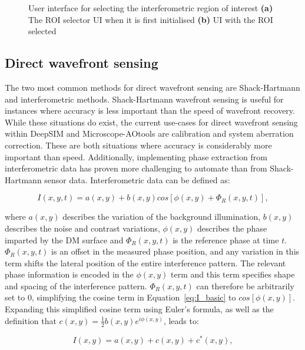 \begin{figure}[h]
\begin{subfigure}{0.4\textwidth}
		\caption{}
		\label{fig:ROI_selector}
	\end{subfigure}
	\caption[User interface for selecting the interferometric region of interest]{User interface for selecting the interferometric region of interest \textbf{(a)} The ROI selector UI when it is first initialised \textbf{(b)} UI with the ROI selected}
	\label{fig:ROI_selectors}
\end{figure}

\subsection{Direct wavefront sensing}
\label{subsec:direct_wavefront_sensing}

The two most common methods for direct wavefront sensing are Shack-Hartmann and interferometric methods. Shack-Hartmann wavefront sensing is useful for instances where accuracy is less important than the speed of wavefront recovery. While these situations do exist, the current use-cases for direct wavefront sensing within DeepSIM and Microscope-AOtools are calibration and system aberration correction. These are both situations where accuracy is considerably more important than speed. Additionally, implementing phase extraction from interferometric data has proven more challenging  to automate than from Shack-Hartmann sensor data. Interferometric data can be defined as:

\begin{equation}\label{eq:I_basic}
I(x,y,t) = a(x,y) + b(x,y)cos[\phi(x,y) + \Phi_{R}(x,y,t)],
\end{equation}

where $a(x,y)$ describes the variation of the background illumination, $b(x,y)$ describes the noise and contrast variations, $\phi(x,y)$ describes the phase imparted by the DM surface and $\Phi_{R}(x,y,t)$ is the reference phase at time $t$. $\Phi_{R}(x,y,t)$ is an offset in the measured phase position, and any variation in this term shifts the lateral position of the entire interference pattern. The relevant phase information is encoded in the $\phi(x,y)$ term and this term specifies shape and spacing of the interference pattern. $\Phi_{R}(x,y,t)$ can therefore be arbitrarily set to 0, simplifying the cosine term in Equation~\ref{eq:I_basic} to $cos[\phi(x,y)]$. Expanding this simplified cosine term using Euler's formula, as well as the definition that $c(x,y) = \frac{1}{2}b(x,y)e^{i\phi(x,y)}$, leads to:

\begin{equation}\label{eq:I_cos_expand}
I(x,y) = a(x,y) + c(x,y) + c^{*}(x,y),
\end{equation}

